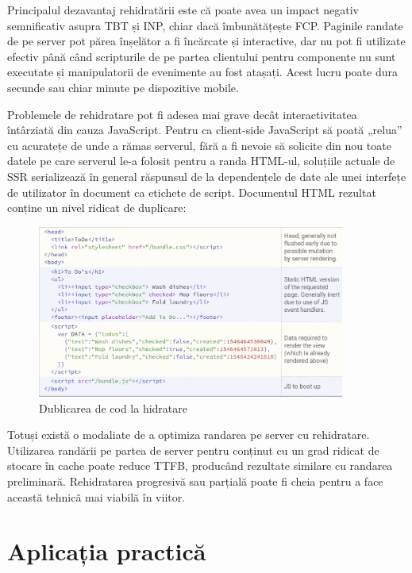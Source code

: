 \documentclass[12pt, a4paper]{report}
\begin{document}
Principalul dezavantaj rehidratării este că poate avea un impact negativ semnificativ asupra TBT și INP, chiar dacă îmbunătățește FCP. Paginile randate de pe server pot părea înșelător a fi încărcate și interactive, dar nu pot fi utilizate efectiv până când scripturile de pe partea clientului pentru componente nu sunt executate și manipulatorii de evenimente au fost atașați. Acest lucru poate dura secunde sau chiar minute pe dispozitive mobile.

Problemele de rehidratare pot fi adesea mai grave decât interactivitatea întârziată din cauza JavaScript. Pentru ca client-side JavaScript să poată „relua” cu acuratețe de unde a rămas serverul, fără a fi nevoie să solicite din nou toate datele pe care serverul le-a folosit pentru a randa HTML-ul, soluțiile actuale de SSR serializează în general răspunsul de la dependențele de date ale unei interfețe de utilizator în document ca etichete de script. Documentul HTML rezultat conține un nivel ridicat de duplicare:

\begin{figure}[htbp]
	\centering
	\includegraphics[width=0.9\textwidth]{hydratation-duplication.png}
	\caption{Dublicarea de cod la hidratare}
	\label{fig:hydratation-dublication}
\end{figure}

Totuși există o modaliate de a optimiza randarea pe server cu rehidratare. Utilizarea randării pe partea de server pentru conținut cu un grad ridicat de stocare în cache poate reduce TTFB, producând rezultate similare cu randarea preliminară. Rehidratarea progresivă sau parțială poate fi cheia pentru a face această tehnică mai viabilă în viitor.



\chapter{Aplicația practică}
\end{document}
